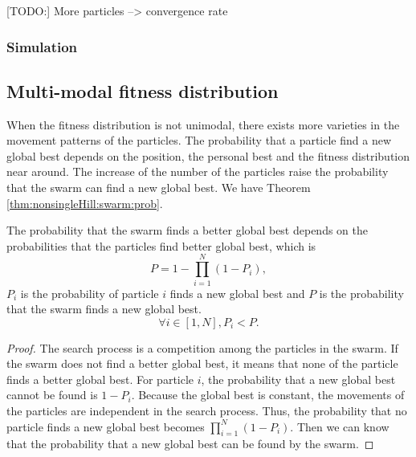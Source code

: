 [TODO:] More particles --> convergence rate

\subsubsection{Simulation}

\subsection{Multi-modal fitness distribution}

When the fitness distribution is not unimodal, there exists more varieties in the movement patterns of the particles.
The probability that a particle find a new global best depends on the position, the personal best and the fitness distribution near around.
The increase of the number of the particles raise the probability that the swarm can find a new global best.
We have Theorem \ref{thm:nonsingleHill:swarm:prob}.

\begin{mythm}
\label{thm:nonsingleHill:swarm:prob}
The probability that the swarm finds a better global best depends on the probabilities that the particles find better global best, which is
\begin{equation}
P = 1 - \prod_{i=1}^{N} ( 1 - P_{i} ),
\end{equation}
$ P_{i} $ is the probability of particle $ i $ finds a new global best
and $ P $ is the probability that the swarm finds a new global best.
\begin{equation}
\forall i \in [1, N], P_{i} < P.
\end{equation}
\begin{proof}
The search process is a competition among the particles in the swarm.
If the swarm does not find a better global best, it means that none of the particle finds a better global best.
For particle $ i $, the probability that a new global best cannot be found is $ 1 - P_{i} $.
Because the global best is constant, the movements of the particles are independent in the search process.
Thus, the probability that no particle finds a new global best becomes
$ \prod_{i=1}^{N} ( 1 - P_{i} ) $.
Then we can know that the probability that a new global best can be found by the swarm.
\end{proof}
\end{mythm}

